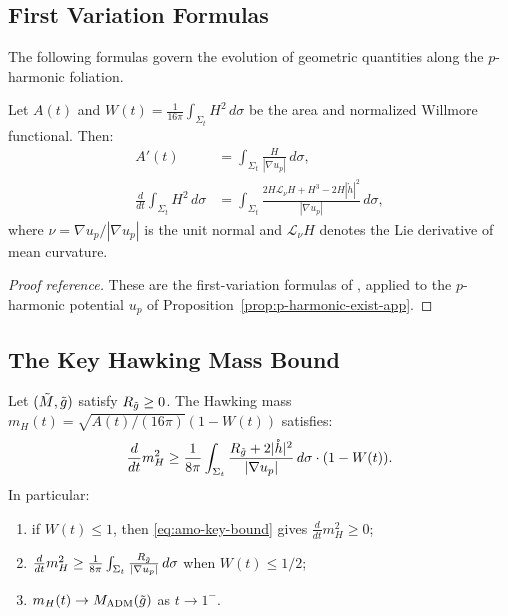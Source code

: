 \subsection{First Variation Formulas}

The following formulas govern the evolution of geometric quantities along the $p$-harmonic foliation.

\begin{proposition}\label{prop:area-willmore-app}
Let $A(t)$ and $W(t) = \frac{1}{16\pi}\int_{\Sigma_t} H^2\,d\sigma$ be the area and normalized Willmore functional. Then:
\begin{align}
A'(t) &= \int_{\Sigma_t} \frac{H}{|\nabla u_p|}\,d\sigma, \label{eq:area-deriv-app} \\
\frac{d}{dt}\int_{\Sigma_t} H^2\,d\sigma &= \int_{\Sigma_t} \frac{2H\mathcal{L}_\nu H + H^3 - 2H|\mathring{h}|^2}{|\nabla u_p|}\,d\sigma, \label{eq:willmore-deriv-app}
\end{align}
where $\nu = \nabla u_p/|\nabla u_p|$ is the unit normal and $\mathcal{L}_\nu H$ denotes the Lie derivative of mean curvature.
\end{proposition}
\begin{proof}[Proof reference]
These are the first-variation formulas of \cite[Proposition~3.2]{amo2022}, applied to the $p$-harmonic potential $u_p$ of Proposition~\ref{prop:p-harmonic-exist-app}.
\end{proof}

\subsection{The Key Hawking Mass Bound}

\begin{theorem}\label{thm:amo-hawking-app}
Let $(\tilde{M}, \tilde{g})$ satisfy $R_{\tilde{g}} \geq 0$. The Hawking mass $m_H(t) = \sqrt{A(t)/(16\pi)}(1 - W(t))$ satisfies:
\begin{equation}\label{eq:amo-key-bound}
\frac{d}{dt}m_H^2 \geq \frac{1}{8\pi}\int_{\Sigma_t} \frac{R_{\tilde{g}} + 2|\mathring{h}|^2}{|\nabla u_p|}\,d\sigma \cdot (1 - W(t)).
\end{equation}
In particular:
\begin{enumerate}[label=\textup{(\roman*)}]
    \item if $W(t) \leq 1$, then \eqref{eq:amo-key-bound} gives $\frac{d}{dt}m_H^2 \geq 0$;
    \item $\frac{d}{dt}m_H^2 \geq \frac{1}{8\pi}\int_{\Sigma_t} \frac{R_{\tilde{g}}}{|\nabla u_p|}\,d\sigma$ when $W(t) \leq 1/2$;
    \item $m_H(t) \to M_{\mathrm{ADM}}(\tilde{g})$ as $t \to 1^-$.
\end{enumerate}
\end{theorem}

